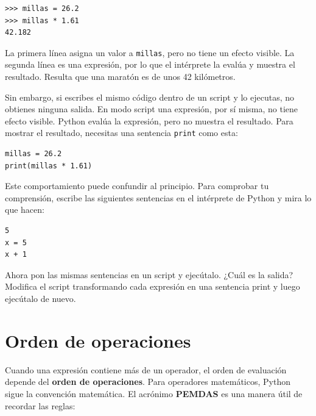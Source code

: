 \documentclass[10pt]{book}
\begin{document}
\begin{verbatim}
>>> millas = 26.2
>>> millas * 1.61
42.182
\end{verbatim}

La primera línea asigna un valor a {\tt millas}, pero no tiene un efecto
visible.  La segunda línea es una expresión, por lo que el
intérprete la evalúa y muestra el resultado.  Resulta que una
maratón es de unos 42 kilómetros.

Sin embargo, si escribes el mismo código dentro de un script y lo ejecutas, no obtienes
ninguna salida.
En modo script una expresión, por sí misma, no tiene
efecto visible.  Python evalúa la expresión, pero no
muestra el resultado.
Para mostrar el resultado, necesitas una sentencia {\tt print} como esta:

\begin{verbatim}
millas = 26.2
print(millas * 1.61)
\end{verbatim}

Este comportamiento puede confundir al principio.
Para comprobar tu comprensión, escribe las siguientes sentencias en el
intérprete de Python y mira lo que hacen:

\begin{verbatim}
5
x = 5
x + 1
\end{verbatim}

Ahora pon las mismas sentencias en un script y ejecútalo.  ¿Cuál
es la salida?  Modifica el script transformando cada
expresión en una sentencia print y luego ejecútalo de nuevo.

\section{Orden de operaciones}

Cuando una expresión contiene más de un operador, el orden de
evaluación depende del {\bf orden de operaciones}.  Para
operadores matemáticos, Python sigue la convención matemática.
El acrónimo {\bf PEMDAS} es una manera útil de
recordar las reglas:
\end{document}
